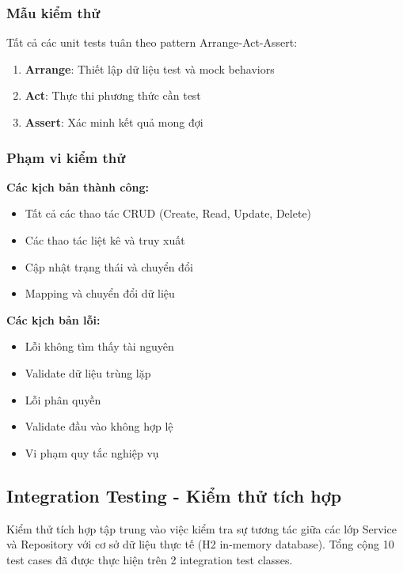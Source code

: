 \subsubsection{Mẫu kiểm thử}

Tất cả các unit tests tuân theo pattern Arrange-Act-Assert:

\begin{enumerate}
    \item \textbf{Arrange}: Thiết lập dữ liệu test và mock behaviors
    \item \textbf{Act}: Thực thi phương thức cần test
    \item \textbf{Assert}: Xác minh kết quả mong đợi
\end{enumerate}

\subsubsection{Phạm vi kiểm thử}

\textbf{Các kịch bản thành công:}
\begin{itemize}
    \item Tất cả các thao tác CRUD (Create, Read, Update, Delete)
    \item Các thao tác liệt kê và truy xuất
    \item Cập nhật trạng thái và chuyển đổi
    \item Mapping và chuyển đổi dữ liệu
\end{itemize}

\textbf{Các kịch bản lỗi:}
\begin{itemize}
    \item Lỗi không tìm thấy tài nguyên
    \item Validate dữ liệu trùng lặp
    \item Lỗi phân quyền
    \item Validate đầu vào không hợp lệ
    \item Vi phạm quy tắc nghiệp vụ
\end{itemize}

\subsection{Integration Testing - Kiểm thử tích hợp}

Kiểm thử tích hợp tập trung vào việc kiểm tra sự tương tác giữa các lớp Service và Repository với cơ sở dữ liệu thực tế (H2 in-memory database). Tổng cộng 10 test cases đã được thực hiện trên 2 integration test classes.

